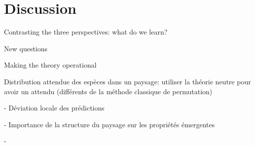 \documentclass[letterpaper,twocolumn,showkeys]{revtex4-1}
\begin{document}
\section{Discussion}

Contrasting the three perspectives: what do we learn?

New questions

Making the theory operational

Distribution attendue des espèces dans un paysage: utiliser la théorie neutre pour avoir un attendu (différents de la méthode classique de permutation)

- Déviation locale des prédictions

- Importance de la structure du paysage sur les propriétés émergentes

- 
\end{document}
